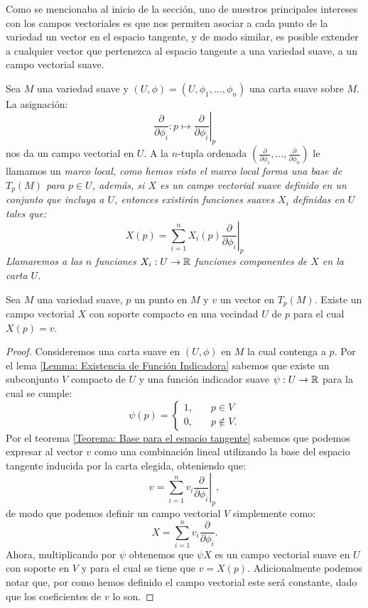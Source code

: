 Como se mencionaba al inicio de la sección, uno de nuestros principales intereses con los campos vectoriales es que nos permiten asociar a cada punto de la variedad un vector en el espacio tangente, y de modo similar, es posible extender a cualquier vector que pertenezca al espacio tangente a una variedad suave, a un campo vectorial suave.

\begin{example}\label{Ejemplo: Campo Vectorial en M}
	Sea $M$ una variedad suave y $(U,\phi)=(U,\phi_1, \dots,\phi_n)$ una carta suave sobre $M$. La asignación:
	\[
		\frac{\partial}{\partial \phi_i}: p \mapsto \left. \frac{\partial}{\partial \phi_i}\right|_{p}
	\]
	nos da un campo vectorial en $U$. A la $n$-tupla ordenada $(\frac{\partial}{\partial \phi_1}, \dots, \frac{\partial}{\partial \phi_n})$ le llamamos un \it{marco local}, como hemos visto el marco local forma una base de $T_p(M)$ para $p \in U$, además, si $X$ es un campo vectorial suave definido en un conjunto que incluya a $U$, entonces existirán funciones suaves $X_i$ definidas en $U$ tales que:
	\[
		X(p) = \sum_{i=1}^{n}X_i(p)\left.\frac{\partial}{\partial\phi_i} \right|_{p}
	\]
	Llamaremos a las $n$ funciones $X_i: U \to \mathbb{R}$ \it{funciones componentes de $X$} en la carta $U$.
\end{example}


\begin{lemma}\label{Lema: Existencia de Campo Vectorial Suave}
	Sea $M$ una variedad suave, $p$ un punto en $M$ y $v$ un vector en $T_p(M)$. Existe un campo vectorial $X$ con soporte compacto en una vecindad $U$ de $p$ para el cual $X(p) = v$.
\end{lemma}

\begin{proof}
	Consideremos una carta suave en $(U,\phi)$ en $M$ la cual contenga a $p$. Por el lema \ref{Lemma: Existencia de Función Indicadora} sabemos que existe un subconjunto $V$ compacto de $U$ y una función indicador suave $\psi: U \to \mathbb{R}$ para la cual se cumple:
	\[
		\psi(p) = \begin{cases}
			1, \quad & p \in V     \\
			0, \quad & p \notin V.
		\end{cases}
	\]
	Por el teorema \ref{Teorema: Base para el espacio tangente} sabemos que podemos expresar al vector $v$ como una combinación lineal utilizando la base del espacio tangente inducida por la carta elegida, obteniendo que:
	\[
		v = \sum_{i=1}^{n} v_i
		\left. \frac{\partial}{\partial \phi_i} \right|_p,
	\]
	de modo que podemos definir un campo vectorial $V$ simplemente como:
	\[
		X = \sum_{i=1}^n v_i \frac{\partial}{\partial \phi_i}.
	\]
	Ahora, multiplicando por $\psi$ obtenemos que $\psi X$ es un campo vectorial suave en $U$ con soporte en $V$ y para el cual se tiene que $v = X(p)$. Adicionalmente podemos notar que, por como hemos definido el campo vectorial este será constante, dado que los coeficientes de $v$ lo son.
\end{proof}


